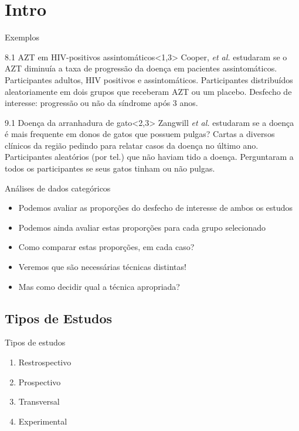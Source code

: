 \documentclass{beamer}
\begin{document}
\section{Intro}

\begin{frame}{Exemplos}
  \begin{exampleblock}{8.1 AZT em HIV-positivos assintomáticos}<1,3>
    Cooper, {\em et al.} estudaram se o AZT diminuía a taxa de progressão da doença em pacientes assintomáticos.
    Participantes adultos, HIV positivos e assintomáticos.
    Participantes distribuídos aleatoriamente em dois grupos que receberam AZT ou um placebo.
    Desfecho de interesse: progressão ou não da síndrome após 3 anos.
  \end{exampleblock}
  \begin{exampleblock}{9.1 Doença da arranhadura de gato}<2,3>
    Zangwill {\em et al.} estudaram se a doença é mais frequente em donos de gatos que possuem pulgas?
    Cartas a diversos clínicos da região pedindo para relatar casos da doença no último ano.
    Participantes aleatórios (por tel.) que não haviam tido a doença.
    Perguntaram a todos os participantes se seus gatos tinham ou não pulgas.
  \end{exampleblock}
\end{frame}

\begin{frame}{Análises de dados categóricos}
  \begin{itemize}
  \item Podemos avaliar as proporções do desfecho de interesse de ambos os estudos
  \item Podemos ainda avaliar estas proporções para cada grupo selecionado
  \item Como comparar estas proporções, em cada caso?
  \item Veremos que são necessárias técnicas distintas!
  \item Mas como decidir qual a técnica apropriada?
  \end{itemize}
\end{frame}

\subsection{Tipos de Estudos}

\begin{frame}{Tipos de estudos}
  \begin{enumerate}
  \item Restrospectivo
  \item Prospectivo
  \item Transversal
  \item Experimental
  \end{enumerate}
\end{frame}
\end{document}
